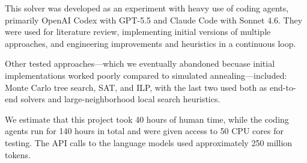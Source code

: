 \documentclass[a4paper,UKenglish,cleveref,autoref]{lipics-v2021}
\begin{document}
This solver was developed as an experiment with heavy use of coding agents,
primarily OpenAI Codex with GPT-5.5 and Claude Code with Sonnet 4.6.
They were used for literature review, implementing initial versions of
multiple approaches, and engineering improvements and heuristics in a continuous
loop.

Other tested approaches---which we eventually abandoned becuase initial implementations
worked poorly compared to simulated annealing---included: Monte Carlo tree search, SAT, and ILP, with the last two used both as end-to-end solvers and large-neighborhood local search heuristics.

We estimate that this project took 40 hours of human time, while the coding agents
run for 140 hours in total and were given access to 50 CPU cores for testing.
The API calls to the language models used approximately 250 million tokens.


\end{document}
